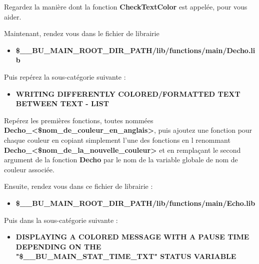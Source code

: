 \documentclass[a4paper,10pt]{article}
\begin{document}
\begin{justify}
    Regardez la manière dont la fonction \textbf{\color{mauve}CheckTextColor} est appelée, pour vous aider.\\[1\baselineskip]
\end{justify}

\begin{justify}
	Maintenant, rendez vous dans le fichier de librairie

	\begin{itemize}
    	\item \textbf{\color{orange}\$\_\_BU\_MAIN\_ROOT\_DIR\_PATH\color{lime}/lib/functions/main/Decho.lib}
	\end{itemize}
\end{justify}

\begin{justify}
	Puis repérez la sous-catégorie suivante :

	\begin{itemize}
    	\item \textbf{WRITING DIFFERENTLY COLORED/FORMATTED TEXT BETWEEN TEXT - LIST}
	\end{itemize}
\end{justify}

\begin{justify}
	Repérez les premières fonctions, toutes nommées \textbf{\color{mauve}Decho\_<\$nom\_de\_couleur\_en\_anglais>}, puis ajoutez une fonction pour chaque couleur en copiant simplement l'une des fonctions en l renommant \textbf{\color{mauve}Decho\_<\$nom\_de\_la\_nouvelle\_couleur>} et en remplaçant le second argument de la fonction \textbf{\color{mauve}Decho} par le nom de la variable globale de nom de couleur associée.\\[1\baselineskip]
\end{justify}

\begin{justify}
	Ensuite, rendez vous dans ce fichier de librairie :

	\begin{itemize}
		\item \textbf{\color{orange}\$\_\_BU\_MAIN\_ROOT\_DIR\_PATH\color{lime}/lib/functions/main/Echo.lib}
	\end{itemize}		
\end{justify}

\begin{justify}
	Puis dans la sous-catégorie suivante :
	
	\begin{itemize}
    	\item \textbf{DISPLAYING A COLORED MESSAGE WITH A PAUSE TIME DEPENDING ON THE\\ "\$\_\_BU\_MAIN\_STAT\_TIME\_TXT" STATUS VARIABLE}
	\end{itemize}
\end{justify}
\end{document}
